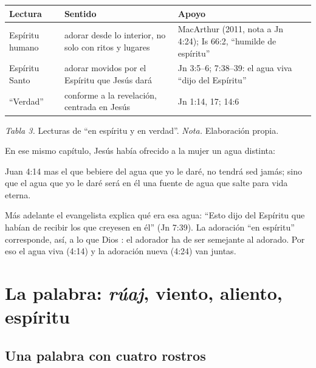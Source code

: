 \begin{center}\small\renewcommand{\arraystretch}{1.22}
\begin{tabular}{@{}L{3.0cm}L{5.6cm}L{5.6cm}@{}}
\toprule
\textbf{Lectura} & \textbf{Sentido} & \textbf{Apoyo} \\ \midrule
Espíritu humano & adorar desde lo interior, no solo con ritos y lugares & MacArthur (2011, nota a Jn 4:24); Is 66:2, ``humilde de espíritu'' \\
Espíritu Santo & adorar movidos por el Espíritu que Jesús dará & Jn 3:5--6; 7:38--39: el agua viva ``dijo del Espíritu'' \\
``Verdad'' & conforme a la revelación, centrada en Jesús & Jn 1:14, 17; 14:6 \\
\bottomrule
\end{tabular}\par
{\footnotesize\color{gris}\textit{Tabla 3.} Lecturas de ``en espíritu y en verdad''. \textit{Nota.} Elaboración propia.}
\end{center}

En ese mismo capítulo, Jesús había ofrecido a la mujer un agua distinta:

\begin{verso}{Juan 4:14}
mas el que bebiere del agua que yo le daré, no tendrá sed jamás; sino que el agua que yo le daré será en él una fuente de agua que salte para vida eterna.
\end{verso}

Más adelante el evangelista explica qué era esa agua: ``Esto dijo del Espíritu que habían de recibir los que creyesen en él'' (Jn 7:39). La adoración ``en espíritu'' corresponde, así, a lo que Dios : el adorador ha de ser semejante al adorado. Por eso el agua viva (4:14) y la adoración nueva (4:24) van juntas.


\section{La palabra: \emph{rúaj}, viento, aliento, espíritu}

\subsection{Una palabra con cuatro rostros}

